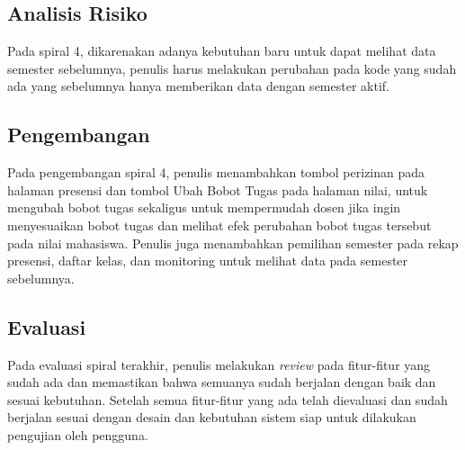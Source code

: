 \subsection{Analisis Risiko}
	Pada spiral 4, dikarenakan adanya kebutuhan baru untuk dapat melihat data semester sebelumnya, penulis harus melakukan perubahan pada kode yang sudah ada yang sebelumnya hanya memberikan data dengan semester aktif.
\subsection{Pengembangan}
	Pada pengembangan spiral 4, penulis menambahkan tombol perizinan pada halaman presensi dan tombol Ubah Bobot Tugas pada halaman nilai, untuk mengubah bobot tugas sekaligus untuk mempermudah dosen jika ingin menyesuaikan bobot tugas dan melihat efek perubahan bobot tugas tersebut pada nilai mahasiswa. Penulis juga menambahkan pemilihan semester pada rekap presensi, daftar kelas, dan monitoring untuk melihat data pada semester sebelumnya. 
\subsection{Evaluasi}
	Pada evaluasi spiral terakhir, penulis melakukan \textit{review} pada fitur-fitur yang sudah ada dan memastikan bahwa semuanya sudah berjalan dengan baik dan sesuai kebutuhan. Setelah semua fitur-fitur yang ada telah dievaluasi dan sudah berjalan sesuai dengan desain dan kebutuhan sistem siap untuk dilakukan pengujian oleh pengguna.


